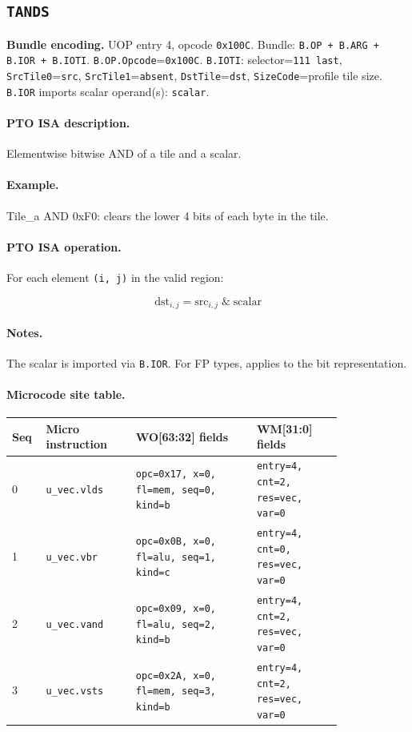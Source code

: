 \subsection{\texttt{TANDS}}
\noindent\textbf{Bundle encoding.} UOP entry 4, opcode \texttt{0x100C}. Bundle: \texttt{B.OP + B.ARG + B.IOR + B.IOTI}. \texttt{B.OP.Opcode}=\texttt{0x100C}. \texttt{B.IOTI}: selector=\texttt{111 last}, \texttt{SrcTile0}=\texttt{src}, \texttt{SrcTile1}=\texttt{absent}, \texttt{DstTile}=\texttt{dst}, \texttt{SizeCode}=profile tile size. \texttt{B.IOR} imports scalar operand(s): \texttt{scalar}.\par\smallskip
{\small
\paragraph{PTO ISA description.}
Elementwise bitwise AND of a tile and a scalar.
\paragraph{Example.}
Tile\_a AND 0xF0: clears the lower 4 bits of each byte in the tile.
\par\smallskip
\paragraph{PTO ISA operation.}
For each element \texttt{(i, j)} in the valid region:

\[
\mathrm{dst}_{i,j} = \mathrm{src}_{i,j} \;\&\; \mathrm{scalar}
\]
}\par\smallskip
\paragraph{Notes.}
The scalar is imported via \texttt{B.IOR}. For FP types, applies to the bit representation.
\paragraph{Microcode site table.}
{\scriptsize
\begin{longtable}{@{}R{0.055\linewidth}L{0.23\linewidth}L{0.31\linewidth}L{0.22\linewidth}@{}}
\toprule
Seq & Micro instruction & WO[63:32] fields & WM[31:0] fields \\
 & \texttt{u\_vec.vlds} & \texttt{opc=0x17, x=0, fl=mem, seq=0, kind=b} & \texttt{entry=4, cnt=2, res=vec, var=0} \\
1 & \texttt{u\_vec.vbr} & \texttt{opc=0x0B, x=0, fl=alu, seq=1, kind=c} & \texttt{entry=4, cnt=0, res=vec, var=0} \\
2 & \texttt{u\_vec.vand} & \texttt{opc=0x09, x=0, fl=alu, seq=2, kind=b} & \texttt{entry=4, cnt=2, res=vec, var=0} \\
3 & \texttt{u\_vec.vsts} & \texttt{opc=0x2A, x=0, fl=mem, seq=3, kind=b} & \texttt{entry=4, cnt=2, res=vec, var=0} \\
\bottomrule
\end{longtable}
}

